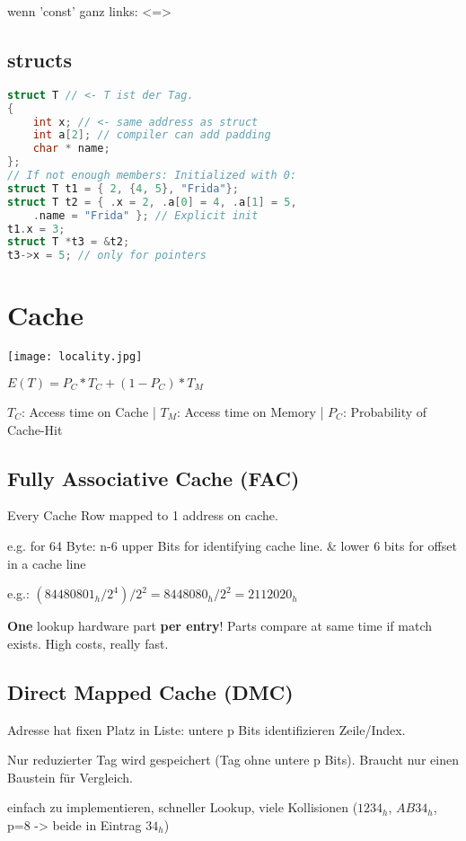 \begin{multicols*}{4}
wenn 'const' ganz links:  <=> 

\subsection{structs}
\begin{lstlisting}[language=c]
struct T // <- T ist der Tag.
{
    int x; // <- same address as struct
    int a[2]; // compiler can add padding
    char * name;
};
// If not enough members: Initialized with 0:
struct T t1 = { 2, {4, 5}, "Frida"};
struct T t2 = { .x = 2, .a[0] = 4, .a[1] = 5,
    .name = "Frida" }; // Explicit init
t1.x = 3;
struct T *t3 = &t2;
t3->x = 5; // only for pointers
\end{lstlisting}

\section{Cache}
\texttt{[image: locality.jpg]}

\(E(T) = P_C * T_C + (1 - P_C )* T_M\)

\(T_C\): Access time on Cache |
\(T_M\): Access time on Memory |
\(P_C\): Probability of Cache-Hit

\subsection{Fully Associative Cache (FAC)}
Every Cache Row mapped to 1 address on cache.

e.g. for 64 Byte: n-6 upper Bits for identifying cache line. \& lower 6 bits for offset in a cache line

e.g.: \((84480801_h / 2^4) / 2^2 = 8448080_h / 2^2 = 2112020_h\)

\textbf{One} lookup hardware part \textbf{per entry}! Parts compare at same time if match exists. High costs, really fast.

\subsection{Direct Mapped Cache (DMC)}

Adresse hat fixen Platz in Liste: untere p Bits identifizieren Zeile/Index.

Nur reduzierter Tag wird gespeichert (Tag ohne untere p Bits). Braucht nur einen Baustein für Vergleich.

einfach zu implementieren, schneller Lookup, viele Kollisionen (\(1234_h\), \(AB34_h\), p=8 -> beide in Eintrag \(34_h\))



\end{multicols*}

